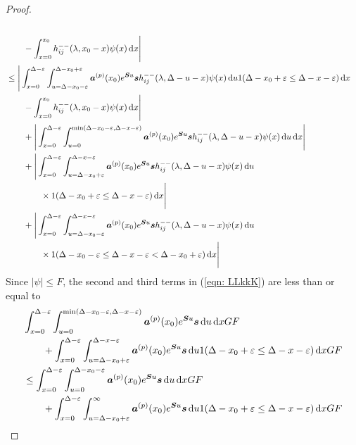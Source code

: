 \begin{proof}
\begin{align}
		  \\&\qquad{}- \int_{x=0}^{x_0} h_{ij}^{--}(\lambda, x_0 - x)\psi(x)\, \mathrm{d} x \Bigg| \nonumber 
		\\&\leq \Bigg| \int_{x=0}^{\Delta-\varepsilon}\int_{u=\Delta-x_0-\varepsilon}^{\Delta-x_0+\varepsilon} \boldsymbol a^{(p)}(x_0)e^{\boldsymbol Su}\boldsymbol s h_{ij}^{--}(\lambda, \Delta - u - x) \psi(x) \, \mathrm{d} u 1(\Delta-x_0+\varepsilon\leq \Delta-x-\varepsilon) \, \mathrm{d} x\nonumber
		\\&\qquad{} - \int_{x=0}^{x_0} h_{ij}^{--}(\lambda, x_0 - x)\psi(x)\, \mathrm{d} x \Bigg| \nonumber 
		\\&\qquad {}+\Bigg|\int_{x=0}^{\Delta-\varepsilon}\int_{u=0}^{\min(\Delta-x_0-\varepsilon,\Delta-x-\varepsilon)} \boldsymbol a^{(p)}(x_0)e^{\boldsymbol Su}\boldsymbol s h_{ij}^{--}(\lambda, \Delta - u - x) \psi(x) \, \mathrm{d} u \, \mathrm{d} x\Bigg|\nonumber
		\\&\qquad {}+\Bigg|\int_{x=0}^{\Delta-\varepsilon}\int_{u=\Delta-x_0+\varepsilon}^{\Delta-x-\varepsilon} \boldsymbol a^{(p)}(x_0)e^{\boldsymbol Su}\boldsymbol s h_{ij}^{--}(\lambda, \Delta - u - x) \psi(x) \, \mathrm{d} u \nonumber 
		\\&\qquad\qquad \times1(\Delta-x_0+\varepsilon\leq \Delta - x -\varepsilon)\, \mathrm{d} x\Bigg|\nonumber
		\\&\qquad {}+\Bigg|\int_{x=0}^{\Delta-\varepsilon}\int_{u=\Delta-x_0-\varepsilon}^{\Delta-x-\varepsilon} \boldsymbol a^{(p)}(x_0)e^{\boldsymbol Su}\boldsymbol s h_{ij}^{--}(\lambda, \Delta - u - x) \psi(x) \, \mathrm{d} u \nonumber
		\\&\qquad\qquad \times 1(\Delta-x_0-\varepsilon\leq \Delta - x -\varepsilon < \Delta-x_0+\varepsilon)\, \mathrm{d} x\Bigg|   \label{eqn: LLkkK}
	\end{align}
	Since \(|\psi|\leq F\), the second and third terms in (\ref{eqn: LLkkK}) are less than or equal to 
	\begin{align}
		&\int_{x=0}^{\Delta-\varepsilon}\int_{u=0}^{\min(\Delta-x_0-\varepsilon,\Delta-x-\varepsilon)} \bs a^{(p)}(x_0)e^{\bs Su}\bs s  \wrt u \wrt xGF \nonumber
		\\&\qquad {}+\int_{x=0}^{\Delta-\varepsilon}\int_{u=\Delta-x_0+\varepsilon}^{\Delta-x-\varepsilon} \bs a^{(p)}(x_0)e^{\bs Su}\bs s  \wrt u 1(\Delta-x_0+\varepsilon\leq \Delta - x -\varepsilon)\wrt x GF \nonumber
		\\&\leq \int_{x=0}^{\Delta-\varepsilon}\int_{u=0}^{\Delta-x_0-\varepsilon} \bs a^{(p)}(x_0)e^{\bs Su}\bs s  \wrt u \wrt xGF \nonumber
		\\&\qquad {}+\int_{x=0}^{\Delta-\varepsilon}\int_{u=\Delta-x_0+\varepsilon}^{\infty} \bs a^{(p)}(x_0)e^{\bs Su}\bs s  \wrt u 1(\Delta-x_0+\varepsilon\leq \Delta - x -\varepsilon)\wrt x GF \nonumber

\end{align}
\end{proof}
